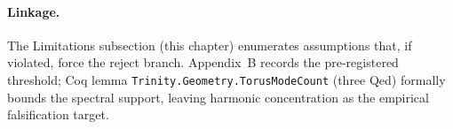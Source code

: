\paragraph{Linkage.}
The Limitations subsection (this chapter) enumerates assumptions that, if
violated, force the reject branch. Appendix~B records the pre-registered
threshold; Coq lemma \texttt{Trinity.Geometry.TorusModeCount} (three Qed)
formally bounds the spectral support, leaving harmonic concentration as the
empirical falsification target.
